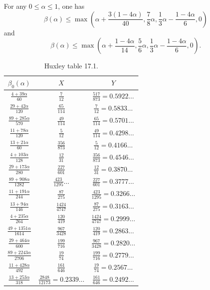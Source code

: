 \begin{theorem}\label{sargos_1995}\cite[Th\'eor\`eme 2.4, Lemme 2.6]{sargos_points_1995}  For any $0 \leq \alpha \leq 1$, one has
$$ \beta(\alpha) \leq \max\left(\alpha + \frac{3(1-4\alpha)}{40}, \frac{7}{8} \alpha, \frac{1}{3}\alpha - \frac{1-4\alpha}{6}, 0\right)$$
and
$$ \beta(\alpha) \leq \max\left(\alpha + \frac{1-4\alpha}{14}, \frac{5}{6} \alpha, \frac{1}{3}\alpha - \frac{1-4\alpha}{6}, 0\right).$$
\end{theorem}

\literature
{}

\begin{table}[ht]
    \caption{Huxley table 17.1.}
    \centering
    \renewcommand{\arraystretch}{1.2}
    \begin{tabular}{|c|c|c|}
    \hline
    $\beta_0(\alpha)$  & $X$ & $Y$ \\
    \hline
    $\frac{4+39\alpha}{60}$ & $\frac{7}{12}$ & $\frac{517}{873} = 0.5922\dots$ \\
    \hline
    $\frac{29+42\alpha}{120}$ & $\frac{65}{114}$ & $\frac{7}{12} = 0.5833\dots$ \\
    \hline
    $\frac{89+285\alpha}{570}$ & $\frac{49}{114}$ & $\frac{65}{114} = 0.5701\dots$ \\
    \hline
    $\frac{11+78\alpha}{120}$ & $\frac{5}{12}$ & $\frac{49}{114} = 0.4298\dots$ \\
    \hline
    $\frac{13+21\alpha}{60}$ & $\frac{356}{873}$ & $\frac{5}{12} = 0.4166\dots$ \\
    \hline
    $\frac{4+103\alpha}{128}$ & $\frac{12}{31}$ & $\frac{356}{873} = 0.4546\dots$ \\
    \hline
    $\frac{29+173\alpha}{280}$ & $\frac{227}{601}$ & $\frac{12}{31} = 0.3870\dots$ \\
    \hline
    $\frac{89+908\alpha}{1282}$ & $\frac{423}{1295}\dots$ & $\frac{227}{601} = 0.3777\dots$ \\
    \hline
    $\frac{11+191\alpha}{244}$ & $\frac{87}{275}$ & $\frac{423}{1295} = 0.3266\dots$ \\
    \hline
    $\frac{13+94\alpha}{146}$ & $\frac{1424}{4747}$ & $\frac{87}{275} = 0.3163\dots$\\
    \hline
    $\frac{4+235\alpha}{264}$ & $\frac{120}{419}$ & $\frac{1424}{4747}=0.2999\dots$ \\
    \hline
    $\frac{49+1351\alpha}{1614}$ & $\frac{967}{3428}$ & $\frac{120}{419} = 0.2863\dots$ \\
    \hline
    $\frac{29+464\alpha}{600}$ & $\frac{199}{716}$ & $\frac{967}{3428} = 0.2820\dots$ \\
    \hline
    $\frac{89+2243\alpha}{2706}$ & $\frac{19}{74}$ & $\frac{199}{716} = 0.2779\dots$ \\
    \hline
    $\frac{11+428\alpha}{492}$ & $\frac{161}{646}$ & $\frac{19}{74} = 0.2567\dots$ \\
    \hline
    $\frac{13+253\alpha}{318}$ & $\frac{2848}{12173} =0.2339\dots$ & $\frac{161}{646} = 0.2492\dots$ \\
    \hline
    \end{tabular}
    \end{table}\label{huxley-table-1}

